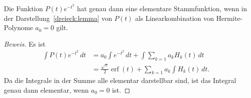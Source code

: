 \begin{satz}
\label{dreieck:satz1}
Die Funktion $P(t)e^{-t^2}$ hat genau dann eine elementare Stammfunktion,
wenn in der Darstellung~\eqref{dreieck:lemma}
von $P(t)$ als Linearkombination von Hermite-Polynome $a_0=0$ gilt.
\end{satz}

\begin{proof}[Beweis]
Es ist
\begin{align*}
\int P(t)e^{-t^2}\,dt
&=
a_0\int e^{-t^2}\,dt
+
\int
\sum_{k=1} a_kH_k(t)\,dt
\\
&=
\frac{\sqrt{\pi}}2
\operatorname{erf}(t)
+
\sum_{k=1} a_k\int H_k(t)\,dt.
\end{align*}
Da die Integrale in der Summe alle elementar darstellbar sind,
ist das Integral genau dann elementar, wenn $a_0=0$ ist.
\end{proof}


